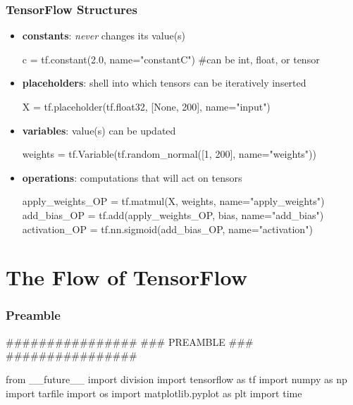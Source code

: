 \documentclass[14pt]{beamer}
\begin{document}
\begin{frame}[fragile]
\frametitle{TensorFlow Structures}
\begin{itemize}
\item{\textbf{constants}}: {\small \textit{never} changes its value(s)} \\
\begin{python}
c = tf.constant(2.0, name="constantC") #can be int, float, or tensor
\end{python}
\item{\textbf{placeholders}}: {\small shell into which tensors can be iteratively inserted} \\
\begin{python}
X = tf.placeholder(tf.float32, [None, 200], name="input")
\end{python}
\item{\textbf{variables}}: {\small value(s) can be updated}
\begin{python}
weights = tf.Variable(tf.random_normal([1, 200], name="weights"))
\end{python}
\item{\textbf{operations}}: {\small computations that will act on tensors}
\begin{python}
apply_weights_OP = tf.matmul(X, weights, name="apply_weights")
add_bias_OP = tf.add(apply_weights_OP, bias, name="add_bias")
activation_OP = tf.nn.sigmoid(add_bias_OP, name="activation")\end{python}
\end{itemize}
\end{frame}

\section{The Flow of TensorFlow}


\begin{frame}[fragile]
  \frametitle{Preamble}
  \begin{python}
################
### PREAMBLE ###
################

from __future__ import division
import tensorflow as tf
import numpy as np
import tarfile
import os
import matplotlib.pyplot as plt
import time
  \end{python}
\end{frame}
\end{document}
